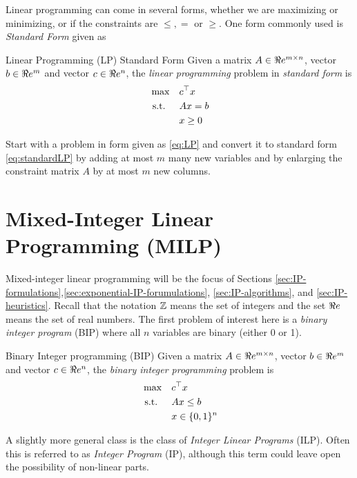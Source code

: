 Linear programming can come in several forms, whether we are maximizing or minimizing, or if the constraints are $\leq, =$ or $\geq$.   One form commonly used is \emph{Standard Form} given as 
\begin{general}{Linear Programming (LP) Standard Form}{\polynomial}
Given a matrix $A \in \Re e^{m\times n}$, vector $b \in \Re e^m$ and vector $c \in \Re e^n$, the \emph{linear programming} problem in \emph{standard form} is
\begin{equation}
\label{eq:standardLP}
\begin{split}
\max \quad & c^\top x\\
\mbox{ s.t. }  \quad & Ax = b\\
& x \geq 0
\end{split}
\end{equation}
\end{general}



\begin{exercise}
\label{exercise:LPconversion}
Start with a problem in form given as \eqref{eq:LP} and convert it to standard form \eqref{eq:standardLP} by adding at most $m$ many new variables and by enlarging the constraint matrix $A$ by at most $m$ new columns.
\end{exercise}
\section{Mixed-Integer Linear Programming (MILP)}
Mixed-integer linear programming will be the focus of Sections \ref{sec:IP-formulations},\ref{sec:exponential-IP-forumulations}, \ref{sec:IP-algorithms}, and \ref{sec:IP-heuristics}.
Recall that the notation ${\mathbb{Z}}$ means the set of integers and the set $\Re e$ means the set of real numbers.  The first problem of interest here is a \emph{binary integer program} (BIP) where all $n$ variables are binary (either 0 or 1).

\begin{general}{Binary Integer programming (BIP)}{\npcomplete}
Given a matrix $A \in \Re e^{m\times n}$, vector $b \in \Re e^m$ and vector $c \in \Re e^n$, the \emph{binary integer programming} problem is
\begin{equation}
\label{eq:BIP}
\begin{split}
\max \quad & c^\top x\\
\mbox{ s.t. }  \quad & Ax \leq b\\
& x \in \{0,1\}^n
\end{split}
\end{equation}
\end{general}
A slightly more general class is the class of \emph{Integer Linear Programs} (ILP).  Often this is referred to as \emph{Integer Program} (IP), although this term could leave open the possibility of non-linear parts.

